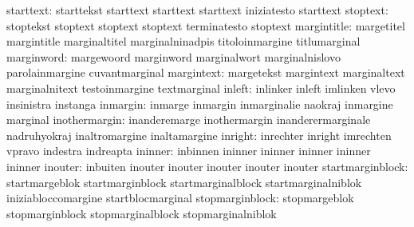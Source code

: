                        starttext: starttekst                       starttext
                                  starttext                        starttext
                                  iniziatesto                      starttext
                        stoptext: stoptekst                        stoptext
                                  stoptext                         stoptext
                                  terminatesto                     stoptext
                     margintitle: margetitel                       margintitle
                                  marginaltitel                    marginalninadpis
                                  titoloinmargine                  titlumarginal
                      marginword: margewoord                       marginword
                                  marginalwort                     marginalnislovo
                                  parolainmargine                  cuvantmarginal
                      margintext: margetekst                       margintext
                                  marginaltext                     marginalnitext
                                  testoinmargine                   textmarginal
                          inleft: inlinker                         inleft
                                  imlinken                         vlevo
                                  insinistra                       instanga
                        inmargin: inmarge                          inmargin
                                  inmarginalie                     naokraj
                                  inmargine                        marginal
                   inothermargin: inanderemarge                    inothermargin
                                  inanderermarginale               nadruhyokraj
                                  inaltromargine                   inaltamargine
                         inright: inrechter                        inright
                                  imrechten                        vpravo
                                  indestra                         indreapta
ininner: inbinnen ininner
         ininner  ininner
         ininner  ininner
inouter: inbuiten inouter
         inouter  inouter
         inouter  inouter
                startmarginblock: startmargeblok                   startmarginblock
                                  startmarginalblock               startmarginalniblok
                                  iniziabloccomargine              startblocmarginal
                 stopmarginblock: stopmargeblok                    stopmarginblock
                                  stopmarginalblock                stopmarginalniblok
